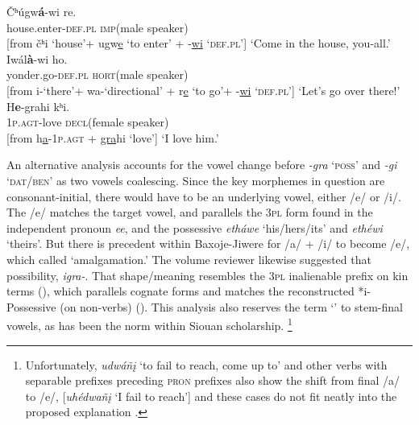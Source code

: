 \documentclass[output=paper]{LSP/langsci}
\begin{document}
\begin{exe}
\ex \gll \v{C}ʰúgw\textbf{á}-wi    re. \\
house.enter-\textsc{def.pl}  \textsc{imp}(male speaker) \\

[from \v{c}ʰi `house'+ ugw\underline{e} `to enter' + -\underline{wi} `\textsc{def.pl}']
\trans `Come in the house, you-all.'  \citep[``Giants'' Bk2 LN49]{Marsh1936}
\ex \gll Iwál\textbf{à}-wi          ho. \\
yonder.go-\textsc{def.pl} \textsc{hort}(male speaker)\\ 

[from i-`there'+ wa-`directional' + r\underline{e} `to go'+ -\underline{wi} `\textsc{def.pl}'] 		
\trans `Let's go over there!' 	\citep[``The Twins'' LN65]{Marsh1936}
\ex \gll  H\textbf{e}-grahi kʰi.  \\
1\textsc{p.agt}-love   \textsc{decl}(female speaker) \\

[from h\underline{a}-1\textsc{p.agt} + \underline{gra}hi `love'] 
\trans `I love him.'  
\end{exe} 

An alternative analysis accounts for the vowel change before \textit{-gra} `\textsc{poss}' and \textit{-gi} `\textsc{dat/ben}' as two vowels coalescing.  Since the key morphemes in question are consonant-initial, there would have to be an underlying vowel, either /e/ or /i/.   The /e/ matches the target vowel, and parallels the \textsc{3pl} form found in the independent pronoun \textit{ee}, and the possessive \textit{etháwe} `his/hers/its' and \textit{ethéwi} `theirs'.  But there is precedent within Baxoje-Jiwere for /a/ + /i/ to become /e/, which \citet[239]{Whitman1947} called `amalgamation.'  The volume reviewer likewise suggested that possibility, \textit{igra-}.  That shape/meaning resembles the \textsc{3pl} inalienable prefix on kin terms (), which parallels cognate  forms and matches the reconstructed  *i- Possessive (on non-verbs) (\citealt{Rood1979}).  This analysis also reserves the term `' to stem-final vowels, as has been the norm within Siouan scholarship. \footnote{Unfortunately, \textit{udwáñ\k{i}} `to fail to reach, come up to' and other verbs with separable prefixes preceding \textsc{pron} prefixes also show the shift from final /a/ to /e/, [\textit{uhédwañ\k{i}} `I fail to reach'] and these cases do not fit neatly into the proposed explanation \citep[240]{Whitman1947}.}
           
\end{document}
